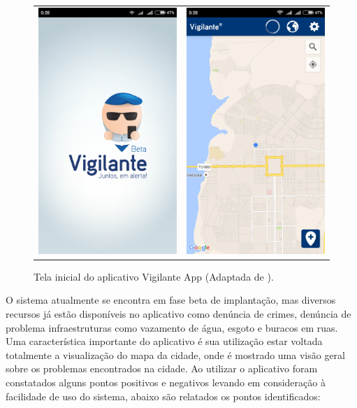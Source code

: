 \begin{figure}[!h]
\centering
    \begin{tabular}{cc}
     \includegraphics[width=.40\textwidth]{figuras/start_vigilante_app.png}  &   \includegraphics[width=.40\textwidth]{figuras/maps_vigilante.png} 
    \end{tabular}
    \caption{Tela inicial do aplicativo Vigilante App (Adaptada de \cite{vigilante_app}).}
    \label{vigilante-app}
\end{figure}

O sistema atualmente se encontra em fase beta de implantação, mas diversos recursos já estão disponíveis no aplicativo como denúncia de crimes, denúncia de problema infraestruturas como vazamento de água, esgoto e buracos em ruas. Uma característica importante do aplicativo é sua utilização estar voltada totalmente a visualização do mapa da cidade, onde é mostrado uma visão geral sobre os problemas encontrados na cidade. Ao utilizar o aplicativo foram constatados alguns pontos positivos e negativos levando em consideração à facilidade de uso do sistema, abaixo são relatados os pontos identificados:

